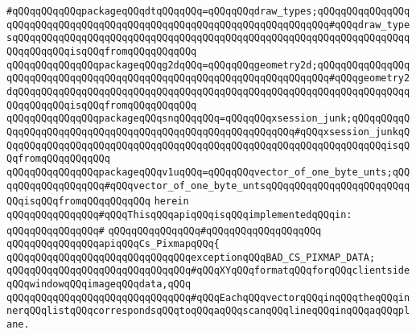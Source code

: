 \verb|#qQQqqQQqqQQqpackageqQQqdtqQQqqQQq=qQQqqQQqdraw_types;qQQqqQQqqQQqqQQqqQQqqQQqqQQqqQQqqQQqqQQqqQQqqQQqqQQqqQQqqQQqqQQqqQQqqQQq#qQQqdraw_typesqQQqqQQqqQQqqQQqqQQqqQQqqQQqqQQqqQQqqQQqqQQqqQQqqQQqqQQqqQQqqQQqqQQqqQQqqQQqqQQqisqQQqfromqQQqqQQqqQQq|\newline
\verb|qQQqqQQqqQQqqQQqpackageqQQqg2dqQQq=qQQqqQQqgeometry2d;qQQqqQQqqQQqqQQqqQQqqQQqqQQqqQQqqQQqqQQqqQQqqQQqqQQqqQQqqQQqqQQqqQQqqQQq#qQQqgeometry2dqQQqqQQqqQQqqQQqqQQqqQQqqQQqqQQqqQQqqQQqqQQqqQQqqQQqqQQqqQQqqQQqqQQqqQQqqQQqqQQqisqQQqfromqQQqqQQqqQQq|\newline
\verb|qQQqqQQqqQQqqQQqpackageqQQqsnqQQqqQQq=qQQqqQQqxsession_junk;qQQqqQQqqQQqqQQqqQQqqQQqqQQqqQQqqQQqqQQqqQQqqQQqqQQqqQQqqQQq#qQQqxsession_junkqQQqqQQqqQQqqQQqqQQqqQQqqQQqqQQqqQQqqQQqqQQqqQQqqQQqqQQqqQQqqQQqqQQqisqQQqfromqQQqqQQqqQQq|\newline
\verb|qQQqqQQqqQQqqQQqpackageqQQqv1uqQQq=qQQqqQQqvector_of_one_byte_unts;qQQqqQQqqQQqqQQqqQQq#qQQqvector_of_one_byte_untsqQQqqQQqqQQqqQQqqQQqqQQqqQQqisqQQqfromqQQqqQQqqQQq|\newline
\verb|herein|\newline
\newline
\verb|qQQqqQQqqQQqqQQq#qQQqThisqQQqapiqQQqisqQQqimplementedqQQqin:|\newline
\verb|qQQqqQQqqQQqqQQq#|\newline
\verb|qQQqqQQqqQQqqQQq#qQQqqQQqqQQqqQQqqQQq|\newline
\newline
\verb|qQQqqQQqqQQqqQQqapiqQQqCs_PixmapqQQq{|\newline
\newline
\verb|qQQqqQQqqQQqqQQqqQQqqQQqqQQqqQQqexceptionqQQqBAD_CS_PIXMAP_DATA;|\newline
\newline
\verb|qQQqqQQqqQQqqQQqqQQqqQQqqQQqqQQq#qQQqXYqQQqformatqQQqforqQQqclientsideqQQqwindowqQQqimageqQQqdata,qQQq|\newline
\verb|qQQqqQQqqQQqqQQqqQQqqQQqqQQqqQQq#qQQqEachqQQqvectorqQQqinqQQqtheqQQqinnerqQQqlistqQQqcorrespondsqQQqtoqQQqaqQQqscanqQQqlineqQQqinqQQqaqQQqplane.|\newline
